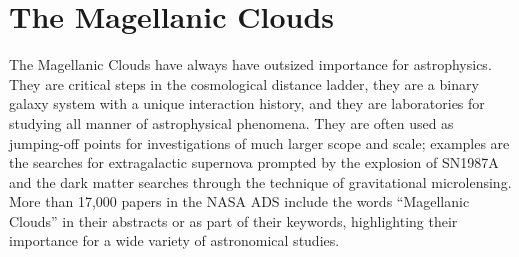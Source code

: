 %
%
%
%
%
%

\section{ The Magellanic Clouds }
\def\secname{MCs}\label{sec:\secname}



The Magellanic Clouds have always have outsized importance for astrophysics.  They are critical steps in the cosmological distance ladder, they are a binary galaxy system with a unique interaction history, and they are laboratories for studying all manner of astrophysical phenomena.  They are often used as jumping-off points for investigations of much larger scope and scale; examples are the searches for extragalactic supernova prompted by the explosion of SN1987A and the dark matter searches through the technique of gravitational microlensing.  More than 17,000 papers in the NASA ADS include the words ``Magellanic Clouds'' in their abstracts or as part of their keywords, highlighting their importance for a wide variety of astronomical studies.

